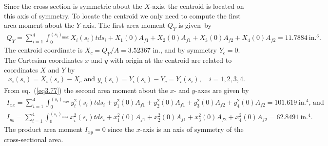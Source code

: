 \documentclass{AeroStructure-ERJohnson}
\begin{document}
\begin{example*}
\noindent Since the cross section is symmetric about the $X$-axis, the centroid is located on this axis of symmetry. To locate the centroid we only need to compute the first area moment about the $Y$-axis. The first area moment $Q_{Y}$ is given~by
\begin{align}\label{ex3.4b}
Q_{Y}=\sum_{i=1}^{4} \int_{0}^{\left(s_{i}\right)_{\max }} X_{i}\left(s_{i}\right) t d s_{i}+X_{1}(0) A_{f 1}+X_{2}(0) A_{f 1}+X_{3}(0) A_{f 2}+X_{4}(0) A_{f 2}=11.7884~\text{in.}^{3}.
\end{align}
The centroid coordinate is $X_{c}=Q_{Y} / A=3.52367$ in., and by symmetry $Y_{c}=0$. The Cartesian coordinates $x$ and $y$ with origin at the centroid are related to coordinates $X$ and $Y$ by
\begin{align}\label{ex3.4c}
x_{i}\left(s_{i}\right)=X_{i}\left(s_{i}\right)-X_{c}\mbox{ and }y_{i}\left(s_{i}\right)=Y_{i}\left(s_{i}\right)-Y_{c}=Y_{i}\left(s_{i}\right),\quad i=1,2,3,4.
\end{align}
From eq.~(\ref{eq3.77}) the second area moment about the $x$- and $y$-axes are given by
\begin{gather}\label{ex3.4d}
I_{x x}=\sum_{i=1}^{4} \int_{0}^{\left(s_{i}\right)_{\max }} y_{i}^{2}\left(s_{i}\right) t d s_{i}+y_{1}^{2}(0) A_{f 1}+y_{2}^{2}(0) A_{f 1}+y_{3}^{2}(0) A_{f 2}+y_{4}^{2}(0) A_{f 2}=101.619~\text{in.}^{4}\mbox{, and}\\[6pt]
I_{y y}=\sum_{i=1}^{4} \int_{0}^{\left(s_{i}\right)_{\max }} x_{i}^{2}\left(s_{i}\right) t d s_{i}+x_{1}^{2}(0) A_{f 1}+x_{2}^{2}(0) A_{f 1}+x_{3}^{2}(0) A_{f 2}+x_{4}^{2}(0) A_{f 2}=62.8491~\text{in.}^{4}.\label{ex3.4e}
\end{gather}
The product area moment $I_{x y}=0$ since the $x$-axis is an axis of symmetry of the cross-sectional area.

\vspace*{-6pt}


\end{example*}
\end{document}

